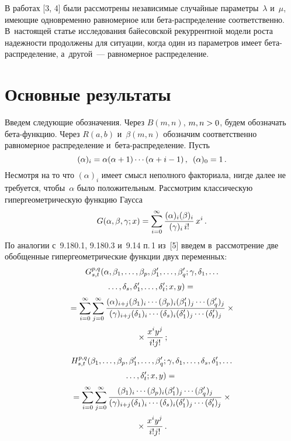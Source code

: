 \begin{multicols}{2}
В работах [3, 4] были рассмотрены независимые случайные параметры~$\lambda$
и~$\mu$, имеющие одновременно равномерное или бе\-та-рас\-пре\-де\-ле\-ние
соответственно. В~настоящей статье исследования байесовской рекуррентной
модели роста на\-деж\-ности продолжены для ситуации, когда один из параметров
имеет бе\-та-рас\-пре\-де\-ле\-ние, а~другой~--- равномерное распределение.

\section{Основные результаты}


Введем следующие обозначения. Через $B(m,n)$, $m,n\hm>0$, будем
обозначать бе\-та-функ\-цию. Через $R(a,b)$ и~$\beta(m,n)$ обозначим соответственно
равномерное распределение и~бе\-та-рас\-пре\-де\-ле\-ние. Пусть
$$
(\alpha)_i=\alpha(\alpha+1)\cdots(\alpha+i-1)\,,\enskip
(\alpha)_0=1\,.
$$
Несмотря на то что $(\alpha)_i$ имеет смысл неполного факториала,
нигде далее не требуется, чтобы~$\alpha$ было положительным.
Рассмотрим классическую гипергеометрическую функцию Гаусса
$$
G(\alpha,\beta,\gamma;x)=\sum\limits_{i=0}^\infty\displaystyle\frac{\displaystyle (\alpha)_i(\beta)_i\mathstrut}{\displaystyle (\gamma)_i \,i!\mathstrut}\,x^i\,.
$$
По аналогии с~9.180.1, 9.180.3 и~9.14 п.\,1 из~[5] введем в~рассмотрение
две обобщенные гипергеометрические функции двух переменных:
\begin{multline}
G^{p,q}_{s,t}(\alpha, \beta_1,\ldots,\beta_p,\beta_1',\ldots,\beta_q';
\gamma,\delta_1,\ldots\\[2pt]
\ldots,\delta_s,\delta_1',\ldots,
\delta_t';x,y)={}\\[2pt]
{}=\sum\limits_{i=0}^\infty\sum\limits_{j=0}^\infty
\displaystyle\frac{\displaystyle (\alpha)_{i+j}(\beta_1)_i\cdots(\beta_p)_i(\beta_1')_j\cdots
(\beta_q')_j\mathstrut}{\displaystyle (\gamma)_{i+j}
(\delta_1)_i\cdots(\delta_s)_i(\delta_1')_j\cdots(\delta_t')_j\mathstrut}\times{}
\\[2pt]
{}\times\displaystyle\frac{\displaystyle x^iy^j\mathstrut}{\displaystyle i!j!\mathstrut}\,;\label{e1-kud}
\end{multline}

\vspace*{-12pt}

\noindent
\begin{multline}
H^{p,q}_{s,t}(\beta_1,\ldots,\beta_p,\beta_1',\ldots,\beta_q';\gamma,\delta_1,
\ldots,\delta_s,\delta_1',\ldots\\[2pt]
\ldots,
\delta_t';x,y)={}\\[2pt]
{}=\sum\limits_{i=0}^\infty\sum\limits_{j=0}^\infty
\displaystyle\frac{\displaystyle (\beta_1)_i\cdots(\beta_p)_i(\beta_1')_j\cdots(\beta_q')_j\mathstrut}{\displaystyle (\gamma)_{i+j}
(\delta_1)_i\cdots(\delta_s)_i(\delta_1')_j\cdots(\delta_t')_j\mathstrut}\times{}\\[2pt]
{}\times
\displaystyle\frac{\displaystyle x^iy^j\mathstrut}{\displaystyle i!j!\mathstrut}\,.\label{e2-kud}
\end{multline}


\end{multicols}
